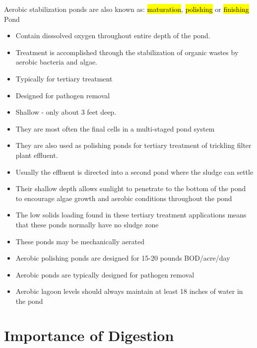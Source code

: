 \documentclass{article}
\begin{document}
Aerobic stabilization ponds are also known as: \hl{maturation}, \hl{polishing} or \hl{finishing} Pond
\begin{itemize}
\item Contain disssolved oxygen throughout entire depth of the pond.
\item Treatment is accomplished through the stabilization of organic wastes by aerobic bacteria and algae.
\item Typically for tertiary treatment
\item Designed for pathogen removal
\item Shallow - only about 3 feet deep. 
\item They are most often the final cells in a multi-staged pond system
\item They are also used as polishing ponds for tertiary treatment of trickling filter plant effluent.
\item Usually the effluent is directed into a second pond where the sludge can settle 
\item Their shallow depth allows sunlight to penetrate to the bottom of the pond to encourage algae growth and aerobic conditions throughout the pond 
\item The low solids loading found in these tertiary treatment applications means that these ponds normally have no sludge zone
\item These ponds may be mechanically aerated 
\item Aerobic polishing ponds are designed for 15-20 pounds BOD/acre/day
\item Aerobic ponds are typically designed for pathogen removal
\item Aerobic lagoon levels should always maintain at least 18 inches of water in the pond
\end{itemize}

\section{Importance of Digestion}
\end{document}
